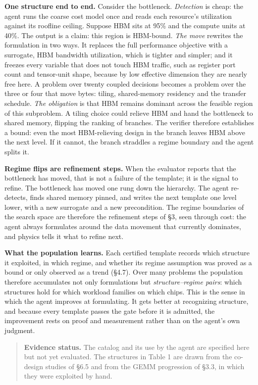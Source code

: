 \documentclass[11pt]{article}
\begin{document}
\textbf{One structure end to end.} Consider the bottleneck. \emph{Detection} is cheap: the agent runs the coarse cost model once and reads each resource's utilization against its roofline ceiling. Suppose HBM sits at 95\% and the compute units at 40\%. The output is a claim: this region is HBM-bound. \emph{The move} rewrites the formulation in two ways. It replaces the full performance objective with a surrogate, HBM bandwidth utilization, which is tighter and simpler; and it freezes every variable that does not touch HBM traffic, such as register port count and tensor-unit shape, because by low effective dimension they are nearly free here. A problem over twenty coupled decisions becomes a problem over the three or four that move bytes: tiling, shared-memory residency and the transfer schedule. \emph{The obligation} is that HBM remains dominant across the feasible region of this subproblem. A tiling choice could relieve HBM and hand the bottleneck to shared memory, flipping the ranking of branches. The verifier therefore establishes a bound: even the most HBM-relieving design in the branch leaves HBM above the next level. If it cannot, the branch straddles a regime boundary and the agent splits it.

\textbf{Regime flips are refinement steps.} When the evaluator reports that the bottleneck has moved, that is not a failure of the template; it is the signal to refine. The bottleneck has moved one rung down the hierarchy. The agent re-detects, finds shared memory pinned, and writes the next template one level lower, with a new surrogate and a new precondition. The regime boundaries of the search space are therefore the refinement steps of §3, seen through cost: the agent always formulates around the data movement that currently dominates, and physics tells it what to refine next.

\textbf{What the population learns.} Each certified template records which structure it exploited, in which regime, and whether its regime assumption was proved as a bound or only observed as a trend (§4.7). Over many problems the population therefore accumulates not only formulations but \emph{structure--regime pairs}: which structures hold for which workload families on which chips. This is the sense in which the agent improves at formulating. It gets better at recognizing structure, and because every template passes the gate before it is admitted, the improvement rests on proof and measurement rather than on the agent's own judgment.

\begin{quote}
\textbf{Evidence status.} The catalog and its use by the agent are specified here but not yet evaluated. The structures in Table 1 are drawn from the co-design studies of §6.5 and from the GEMM progression of §3.3, in which they were exploited by hand.
\end{quote}
\end{document}
